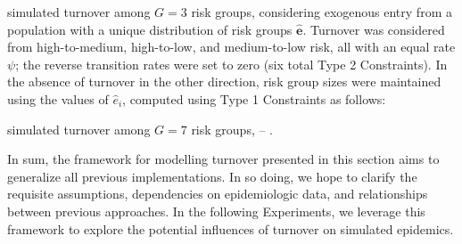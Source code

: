 \par
\citet{Eaton2014} simulated turnover among $G = 3$ risk groups,
considering exogenous entry from a population
with a unique distribution of risk groups $\bm{\hat{e}}$.
Turnover was considered from
high-to-medium, high-to-low, and medium-to-low risk,
all with an equal rate $\psi$;
the reverse transition rates were set to zero
(six total Type 2 Constraints).
In the absence of turnover in the other direction,
risk group sizes were maintained using the values of $\hat{e}_i$,
computed using Type 1 Constraints as follows:

\par
\citet{Boily2015} simulated turnover among $G = 7$ risk groups, -- .
\par
In sum, the framework for modelling turnover presented in this section
aims to generalize all previous implementations.
In so doing, we hope to clarify the requisite assumptions,
dependencies on epidemiologic data,
and relationships between previous approaches.
In the following Experiments, we leverage this framework to explore
the potential influences of turnover on simulated epidemics.
